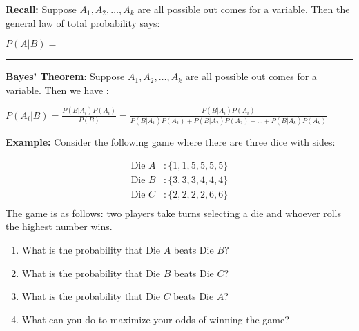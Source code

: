 \documentclass[oneside]{amsart}
\theoremstyle{definition}
\theoremstyle{definition}
\begin{document}
\vfill
\begin{ovalbox}{\begin{minipage}{6.8in}
\vspace{5mm}

\textbf{Recall:}  Suppose $A_1,A_2,\dots,A_k$ are all possible out comes for a variable. Then the general law of total probability says:\\
\begin{center}
  $P(A|B) =$ \rule[-5mm]{35mm}{.1mm}
\end{center}

\end{minipage}}
\end{ovalbox}

\begin{ovalbox}{\begin{minipage}{6.8in}
\vspace{5mm}

\textbf{Bayes' Theorem}: Suppose $A_1,A_2,\dots,A_k$ are all possible out comes for a variable. Then we have :\\
\begin{center}
  $\displaystyle P(A_i|B) = \frac{P(B|A_i) P(A_i)}{P(B)}= \frac{P(B|A_i) P(A_i)}{P(B|A_1)P(A_1)+P(B|A_2)P(A_2) + \dots + P(B|A_k)P(A_k)}$ 
\end{center}

\end{minipage}}
\end{ovalbox}

\vspace{2mm}

\newpage

 \textbf{Example:} Consider the following game where there are three dice with sides:

        \begin{align*}
            \text{Die }A&: \{1,1, 5, 5, 5, 5 \}  \\
            \text{Die }B&: \{3,3,3, 4, 4, 4 \}  \\
            \text{Die }C&: \{2,2,2, 2, 6, 6 \}  \\
        \end{align*}
        The game is as follows: two players take turns selecting a die and whoever rolls the highest number wins.
        \begin{enumerate}
            \item What is the probability that Die $A$ beats Die $B$?

            \vfill 
            \item What is the probability that Die $B$ beats Die $C$?

            \vfill 

            \item What is the probability that Die $C$ beats Die $A$?

            \vfill 
            \vfill

            \item What can you do to maximize your odds of winning the game?

            \vfill 
        \end{enumerate}
\end{document}
